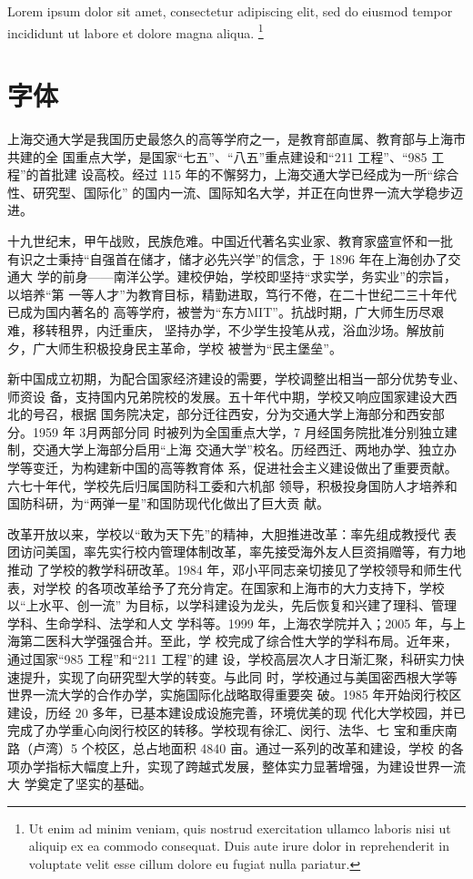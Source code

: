 Lorem ipsum dolor sit amet, consectetur adipiscing elit, sed do eiusmod tempor
incididunt ut labore et dolore magna aliqua. \footnote{Ut enim ad minim veniam,
quis nostrud exercitation ullamco laboris nisi ut aliquip ex ea commodo
consequat. Duis aute irure dolor in reprehenderit in voluptate velit esse cillum
dolore eu fugiat nulla pariatur.}

\section{字体}


上海交通大学是我国历史最悠久的高等学府之一，是教育部直属、教育部与上海市共建的全
国重点大学，是国家“七五”、“八五”重点建设和“211 工程”、“985 工程”的首批建
设高校。经过 115 年的不懈努力，上海交通大学已经成为一所“综合性、研究型、国际化”
的国内一流、国际知名大学，并正在向世界一流大学稳步迈进。 

{\songti 十九世纪末，甲午战败，民族危难。中国近代著名实业家、教育家盛宣怀和一批
  有识之士秉持“自强首在储才，储才必先兴学”的信念，于 1896 年在上海创办了交通大
  学的前身——南洋公学。建校伊始，学校即坚持“求实学，务实业”的宗旨，以培养“第
  一等人才”为教育目标，精勤进取，笃行不倦，在二十世纪二三十年代已成为国内著名的
  高等学府，被誉为“东方MIT”。抗战时期，广大师生历尽艰难，移转租界，内迁重庆，
  坚持办学，不少学生投笔从戎，浴血沙场。解放前夕，广大师生积极投身民主革命，学校
  被誉为“民主堡垒”。
  
  新中国成立初期，为配合国家经济建设的需要，学校调整出相当一部分优势专业、师资设
  备，支持国内兄弟院校的发展。五十年代中期，学校又响应国家建设大西北的号召，根据
  国务院决定，部分迁往西安，分为交通大学上海部分和西安部分。1959 年 3月两部分同
  时被列为全国重点大学，7 月经国务院批准分别独立建制，交通大学上海部分启用“上海
  交通大学”校名。历经西迁、两地办学、独立办学等变迁，为构建新中国的高等教育体
  系，促进社会主义建设做出了重要贡献。六七十年代，学校先后归属国防科工委和六机部
  领导，积极投身国防人才培养和国防科研，为“两弹一星”和国防现代化做出了巨大贡
  献。}

{\heiti 改革开放以来，学校以“敢为天下先”的精神，大胆推进改革：率先组成教授代
  表团访问美国，率先实行校内管理体制改革，率先接受海外友人巨资捐赠等，有力地推动
  了学校的教学科研改革。1984 年，邓小平同志亲切接见了学校领导和师生代表，对学校
  的各项改革给予了充分肯定。在国家和上海市的大力支持下，学校以“上水平、创一流”
  为目标，以学科建设为龙头，先后恢复和兴建了理科、管理学科、生命学科、法学和人文
  学科等。1999 年，上海农学院并入；2005 年，与上海第二医科大学强强合并。至此，学
  校完成了综合性大学的学科布局。近年来，通过国家“985 工程”和“211 工程”的建
  设，学校高层次人才日渐汇聚，科研实力快速提升，实现了向研究型大学的转变。与此同
  时，学校通过与美国密西根大学等世界一流大学的合作办学，实施国际化战略取得重要突
  破。1985 年开始闵行校区建设，历经 20 多年，已基本建设成设施完善，环境优美的现
  代化大学校园，并已完成了办学重心向闵行校区的转移。学校现有徐汇、闵行、法华、七
  宝和重庆南路（卢湾）5 个校区，总占地面积 4840 亩。通过一系列的改革和建设，学校
  的各项办学指标大幅度上升，实现了跨越式发展，整体实力显著增强，为建设世界一流大
  学奠定了坚实的基础。}

